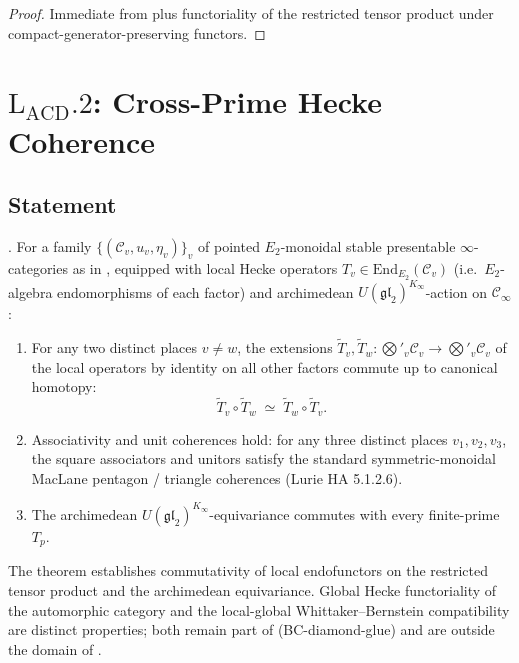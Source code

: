 \begin{proof}
Immediate from  plus functoriality
of the restricted tensor product under compact-generator-preserving
functors.
\end{proof}

\section{\(\mathrm{L}_{\mathrm{ACD}}.2\): Cross-Prime Hecke Coherence}
\label{v4-arith:lacd:L2}

\subsection{Statement}

\begin{theorem}
\label{v4-arith:lacd:thm:L2-closed}
\ClaimStatusProvedHere. For a family
\(\{(\mathcal{C}_{v}, u_{v}, \eta_{v})\}_{v}\) of pointed
\(E_{2}\)-monoidal stable presentable \(\infty\)-categories as in
, equipped with local Hecke
operators \(T_{v} \in \mathrm{End}_{E_{2}}(\mathcal{C}_{v})\) (i.e.\
\(E_{2}\)-algebra endomorphisms of each factor) and archimedean
\(U(\mathfrak{gl}_{2})^{K_{\infty}}\)-action on \(\mathcal{C}_{\infty}\):
\begin{enumerate}
\item For any two distinct places \(v \neq w\), the extensions
\(\widetilde{T}_{v}, \widetilde{T}_{w}: \bigotimes'_{v}\mathcal{C}_{v}
\to \bigotimes'_{v}\mathcal{C}_{v}\) of the local operators by
identity on all other factors commute up to canonical homotopy:
\begin{equation}
\label{v4-arith:lacd:eq:T-commute}
\widetilde{T}_{v} \circ \widetilde{T}_{w}
\;\simeq\;
\widetilde{T}_{w} \circ \widetilde{T}_{v}.
\end{equation}
\item Associativity and unit coherences hold: for any three distinct
places \(v_{1}, v_{2}, v_{3}\), the square associators and unitors
satisfy the standard symmetric-monoidal MacLane pentagon / triangle
coherences (Lurie HA 5.1.2.6).
\item The archimedean
\(U(\mathfrak{gl}_{2})^{K_{\infty}}\)-equivariance commutes with every
finite-prime \(T_{p}\).
\end{enumerate}
\end{theorem}

\begin{remark}
\label{v4-arith:lacd:rem:L2-formal-domain}
The theorem establishes commutativity of local endofunctors on the
restricted tensor product and the archimedean equivariance. Global
Hecke functoriality of the automorphic category and the local-global
Whittaker--Bernstein compatibility are distinct properties; both remain
part of (BC-diamond-glue) and are outside the domain of
.
\end{remark}

